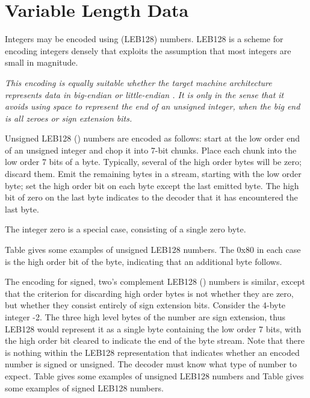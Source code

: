 \section{Variable Length Data}
\label{datarep:variablelengthdata}
Integers may be 
encoded using 
(LEB128) numbers. 
LEB128 is a scheme for encoding integers
densely that exploits the assumption that most integers are
small in magnitude.

\textit{This encoding is equally suitable whether the target machine
architecture represents data in big-endian or little-endian
\byteorder. It is  only in the sense that it
avoids using space to represent the  end of an
unsigned integer, when the big end is all zeroes or sign
extension bits.}

Unsigned LEB128 () 
numbers are encoded as follows:
start at the low order end of an unsigned integer and chop
it into 7-bit chunks. Place each chunk into the low order 7
bits of a byte. Typically, several of the high order bytes
will be zero; discard them. Emit the remaining bytes in a
stream, starting with the low order byte; set the high order
bit on each byte except the last emitted byte. The high bit
of zero on the last byte indicates to the decoder that it
has encountered the last byte.

The integer zero is a special case, consisting of a single
zero byte.

Table 
gives some examples of unsigned LEB128
numbers. The
0x80 in each case is the high order bit of the byte, indicating
that an additional byte follows.


The encoding for signed, two\textquoteright{s} complement LEB128 
() 
numbers is similar, except that the criterion for discarding
high order bytes is not whether they are zero, but whether
they consist entirely of sign extension bits. Consider the
4-byte integer -2. The three high level bytes of the number
are sign extension, thus LEB128 would represent it as a single
byte containing the low order 7 bits, with the high order
bit cleared to indicate the end of the byte stream. Note
that there is nothing within the LEB128 representation that
indicates whether an encoded number is signed or unsigned. The
decoder must know what type of number to expect. 
Table 
gives some examples of unsigned LEB128
numbers and Table 
gives some examples of signed LEB128 
numbers.

